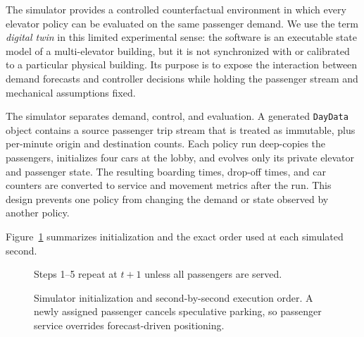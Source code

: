 \documentclass[12pt]{article}
\begin{document}
The simulator provides a controlled counterfactual environment in which every
elevator policy can be evaluated on the same passenger demand. We use the term
\emph{digital twin} in this limited experimental sense: the software is an
executable state model of a multi-elevator building, but it is not synchronized
with or calibrated to a particular physical building. Its purpose is to expose
the interaction between demand forecasts and controller decisions while
holding the passenger stream and mechanical assumptions fixed.

The simulator separates demand, control, and evaluation. A generated
\texttt{DayData} object contains a source passenger trip stream that is treated
as immutable, plus
per-minute origin and destination counts. Each policy run deep-copies the
passengers, initializes four cars at the lobby, and evolves only its private
elevator and passenger state. The resulting boarding times, drop-off times,
and car counters are converted to service and movement metrics after the run.
This design prevents one policy from changing the demand or state observed by
another policy.

Figure~\ref{fig:simulation-loop} summarizes initialization and the exact order
used at each simulated second.

\begin{figure}[H]
  \centering
  \par\smallskip
  {\footnotesize Steps 1--5 repeat at $t+1$ unless all passengers are served.}
  \caption{Simulator initialization and second-by-second execution order. A
  newly assigned passenger cancels speculative parking, so passenger service
  overrides forecast-driven positioning.}
  \label{fig:simulation-loop}
\end{figure}
\end{document}
